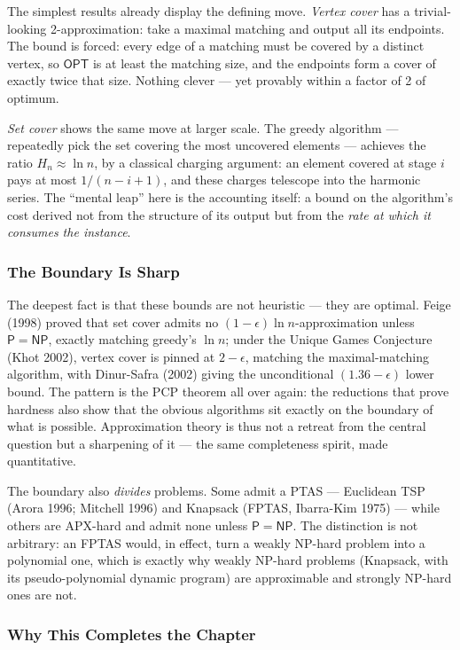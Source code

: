 The simplest results already display the defining move. \emph{Vertex cover} has a trivial-looking 2-approximation: take a maximal matching and output all its endpoints. The bound is forced: every edge of a matching must be covered by a distinct vertex, so $\mathsf{OPT}$ is at least the matching size, and the endpoints form a cover of exactly twice that size. Nothing clever --- yet provably within a factor of 2 of optimum.

\emph{Set cover} shows the same move at larger scale. The greedy algorithm --- repeatedly pick the set covering the most uncovered elements --- achieves the ratio $H_n \approx \ln n$, by a classical charging argument: an element covered at stage $i$ pays at most $1/(n - i + 1)$, and these charges telescope into the harmonic series. The ``mental leap'' here is the accounting itself: a bound on the algorithm's cost derived not from the structure of its output but from the \emph{rate at which it consumes the instance}.

\subsubsection*{The Boundary Is Sharp}

The deepest fact is that these bounds are not heuristic --- they are optimal. Feige (1998) proved that set cover admits no $(1-\epsilon)\ln n$-approximation unless $\mathsf{P} = \mathsf{NP}$, exactly matching greedy's $\ln n$; under the Unique Games Conjecture (Khot 2002), vertex cover is pinned at $2-\epsilon$, matching the maximal-matching algorithm, with Dinur-Safra (2002) giving the unconditional $(1.36-\epsilon)$ lower bound. The pattern is the PCP theorem all over again: the reductions that prove hardness also show that the obvious algorithms sit exactly on the boundary of what is possible. Approximation theory is thus not a retreat from the central question but a sharpening of it --- the same completeness spirit, made quantitative.

The boundary also \emph{divides} problems. Some admit a PTAS --- Euclidean TSP (Arora 1996; Mitchell 1996) and Knapsack (FPTAS, Ibarra-Kim 1975) --- while others are APX-hard and admit none unless $\mathsf{P} = \mathsf{NP}$. The distinction is not arbitrary: an FPTAS would, in effect, turn a weakly NP-hard problem into a polynomial one, which is exactly why weakly NP-hard problems (Knapsack, with its pseudo-polynomial dynamic program) are approximable and strongly NP-hard ones are not.

\subsubsection*{Why This Completes the Chapter}

